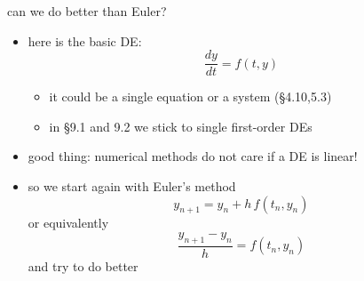 \documentclass[urlcolor=blue,dvipsnames]{beamer}
\begin{document}
\begin{frame}{can we do better than Euler?}

\begin{itemize}
\item here is the basic DE:
    $$\frac{dy}{dt} = f(t,y)$$

\vspace{-2mm}
    \begin{itemize}
    \item it could be a single equation or a system (\S4.10,5.3)
    \item in \S9.1 and 9.2 we stick to single first-order DEs
    \end{itemize}
\item good thing: numerical methods do not care if a DE is linear!
\item so we start again with Euler's method
    $$y_{n+1} = y_n + h\, f(t_n,y_n)$$
or equivalently
    $$\frac{y_{n+1} - y_n}{h} = f(t_n,y_n)$$
and \alert{try to do better}
\end{itemize}
\end{frame}
\end{document}
